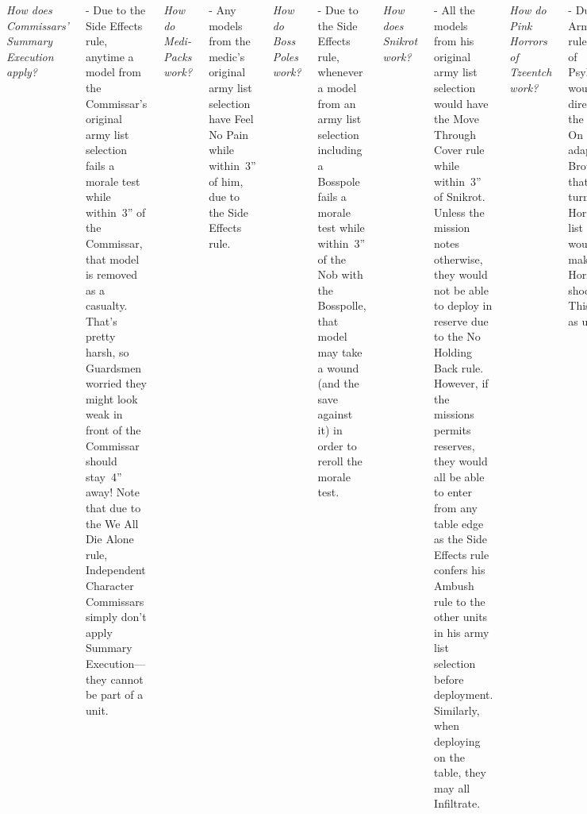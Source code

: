\documentclass{40k}
\begin{document}
\begin{columns}
%

\smallskip\noindent\emph{How does Commissars' Summary Execution
  apply?}

- Due to the Side Effects rule, anytime a model from the Commissar's
original army list selection fails a morale test while within~3'' of
the Commissar, that model is removed as a casualty.  That's pretty
harsh, so Guardsmen worried they might look weak in front of the
Commissar should stay~4'' away!  Note that due to the We All Die Alone
rule, Independent Character Commissars simply don't apply Summary
Execution---they cannot be part of a unit.


\smallskip\noindent\emph{How do Medi-Packs work?}

- Any models from the medic's original army list selection have Feel
No Pain while within~3'' of him, due to the Side Effects rule.

%

\smallskip\noindent\emph{How do Boss Poles work?}

- Due to the Side Effects rule, whenever a model from an army list
selection including a Bosspole fails a morale test while within~3'' of
the Nob with the Bosspolle, that model may take a wound (and the save
against it) in order to reroll the morale test.

\smallskip\noindent\emph{How does Snikrot work?}

- All the models from his original army list selection would have the
Move Through Cover rule while within~3'' of Snikrot.  Unless the
mission notes otherwise, they would not be able to deploy in reserve
due to the No Holding Back rule.  However, if the missions permits
reserves, they would all be able to enter from any table edge as the
Side Effects rule confers his Ambush rule to the other units in his
army list selection before deployment.  Similarly, when deploying on
the table, they may all Infiltrate.


%

\smallskip\noindent\emph{How do Pink Horrors of Tzeentch work?}

- Due to the Army Of One rule, Brotherhood of Psykers/Sorcerors would
not apply directly.  However, the Cast A Spell On You rule adapts
Brotherhood such that on each turn, one Pink Horror per army list
selection would be able to make the Horrors' psychic shooting attack.
This is resolved as usual.



\end{columns}
\end{document}
